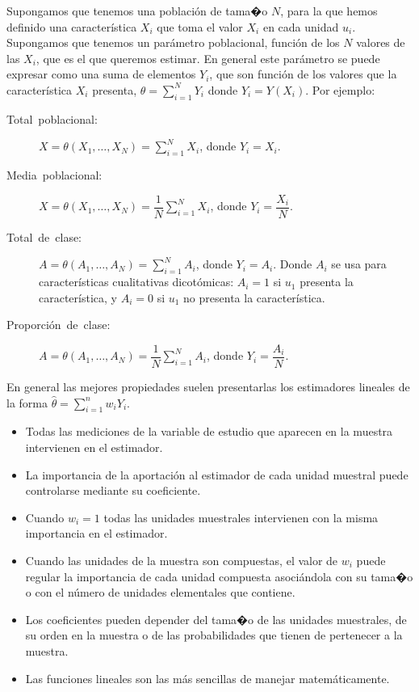 Supongamos que tenemos una poblaci\'on de tama�o $N$, para la que hemos
definido una caracter\'istica $X_{i}$ que toma el valor $X_{i}$ en
cada unidad $u_{i}$. Supongamos que tenemos un par\'ametro poblacional,
funci\'on de los $N$ valores de las $X_{i}$, que es el que queremos
estimar. En general este par\'ametro se puede expresar como una suma
de elementos $Y_{i}$, que son funci\'on de los valores que la caracter\'istica
$X_{i}$ presenta, $\theta=\sum_{i=1}^{N}Y_{i}$ donde $Y_{i}=Y\left(X_{i}\right)$.
Por ejemplo:
\begin{description}
\item [{Total~poblacional:}] $X=\theta\left(X_{1},\ldots,X_{N}\right)=\sum_{i=1}^{N}X_{i}$,
donde $Y_{i}=X_{i}$.
\item [{Media~poblacional:}] $X=\theta\left(X_{1},\ldots,X_{N}\right)=\dfrac{1}{N}\sum_{i=1}^{N}X_{i}$,
donde $Y_{i}=\dfrac{X_{i}}{N}$.
\item [{Total~de~clase:}] $A=\theta\left(A_{1},\ldots,A_{N}\right)=\sum_{i=1}^{N}A_{i}$,
donde $Y_{i}=A_{i}$. Donde $A_{i}$ se usa para caracter\'isticas cualitativas
dicot\'omicas: $A_{i}=1$ si $u_{1}$ presenta la caracter\'istica, y
$A_{i}=0$ si $u_{1}$ no presenta la caracter\'istica.
\item [{Proporci\'on~de~clase:}] $A=\theta\left(A_{1},\ldots,A_{N}\right)=\dfrac{1}{N}\sum_{i=1}^{N}A_{i}$,
donde $Y_{i}=\dfrac{A_{i}}{N}$.
\end{description}
En general las mejores propiedades suelen presentarlas los estimadores
lineales de la forma $\hat{\theta}=\sum_{i=1}^{n}w_{i}Y_{i}$.
\begin{itemize}
\item Todas las mediciones de la variable de estudio que aparecen en la
muestra intervienen en el estimador.
\item La importancia de la aportaci\'on al estimador de cada unidad muestral
puede controlarse mediante su coeficiente.
\item Cuando $w_{i}=1$ todas las unidades muestrales intervienen con la
misma importancia en el estimador.
\item Cuando las unidades de la muestra son compuestas, el valor de $w_{i}$
puede regular la importancia de cada unidad compuesta asoci\'andola
con su tama�o o con el n\'umero de unidades elementales que contiene.
\item Los coeficientes pueden depender del tama�o de las unidades muestrales,
de su orden en la muestra o de las probabilidades que tienen de pertenecer
a la muestra.
\item Las funciones lineales son las m\'as sencillas de manejar matem\'aticamente.
\end{itemize}

